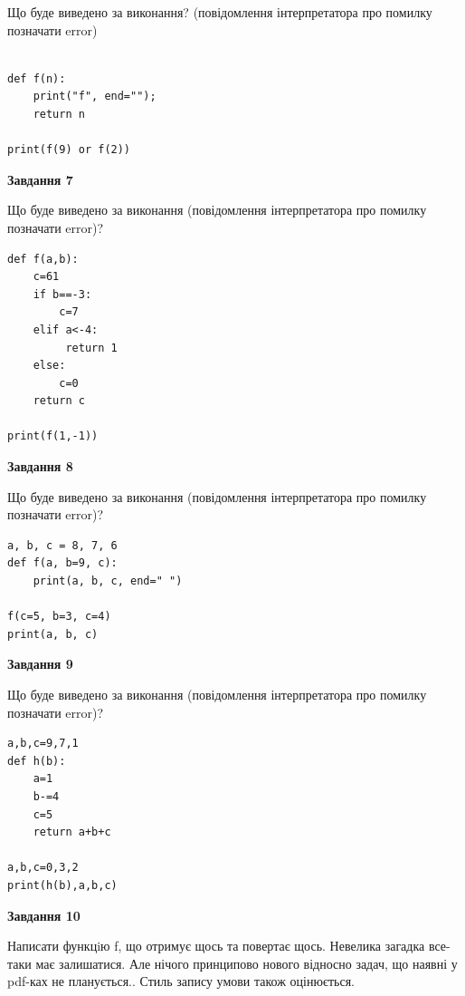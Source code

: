 \documentclass[12pt, ukrainian]{article}
\begin{document}
{\begin {large}
Що буде виведено за виконання? (повідомлення інтерпретатора про помилку позначати error)\par
\begin{verbatim}

def f(n):
    print("f", end="");
    return n

print(f(9) or f(2))
\end{verbatim}

{\begin {center}\textbf{Завдання 7}\end {center}}

Що буде виведено за виконання (повідомлення інтерпретатора про помилку позначати error)?\par
\begin{verbatim}
def f(a,b):
    c=61
    if b==-3:
        c=7
    elif a<-4:
         return 1
    else: 
        c=0
    return c

print(f(1,-1))
\end{verbatim}

{\begin {center}\textbf{Завдання 8}\end {center}}

Що буде виведено за виконання (повідомлення інтерпретатора про помилку позначати error)?\par
\begin{verbatim}
a, b, c = 8, 7, 6
def f(a, b=9, c):
    print(a, b, c, end=" ")

f(c=5, b=3, c=4)
print(a, b, c)
\end{verbatim}

{\begin {center}\textbf{Завдання 9}\end {center}}

Що буде виведено за виконання (повідомлення інтерпретатора про помилку позначати error)?\par
\begin{verbatim}
a,b,c=9,7,1
def h(b):
    a=1
    b-=4
    c=5
    return a+b+c

a,b,c=0,3,2
print(h(b),a,b,c)
\end{verbatim}

{\begin {center}\textbf{Завдання 10}\end {center}}


Написати функцiю f, що отримує щось та повертає щось. Невелика загадка все-таки має залишатися. Але нічого принципово нового відносно задач, що наявні у pdf-ках не планується.. Стиль запису умови також оцінюється.\par
\end {large}}
\newpage
\end{document}
